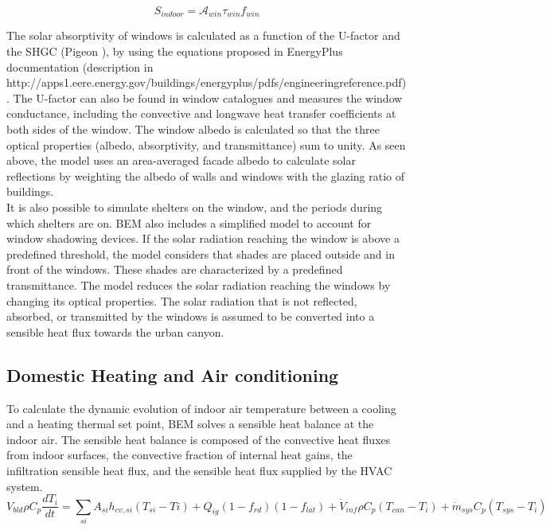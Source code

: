 \begin{equation}
S_{indoor} = \mathcal{A}_{win} \tau_{win} f_{win}
\end{equation}

The solar absorptivity of windows is calculated as a function of the U-factor and the SHGC (Pigeon )\nocite{Pigeon2014}, by using the equations proposed in EnergyPlus documentation (description in http://apps1.eere.energy.gov/buildings/energyplus/pdfs/engineeringreference.pdf). The U-factor can also be found in window catalogues and measures the window conductance, including the convective and longwave heat transfer coefficients at both sides of the window.
The window albedo is calculated so that the three optical properties  (albedo,  absorptivity,  and  transmittance)  sum  to unity. As seen above, the model uses an area-averaged facade albedo to calculate solar reflections by weighting the albedo of walls and windows with the glazing ratio of buildings. \\

It is also possible to simulate shelters on the window, and the periods during which shelters are on. BEM also includes a simplified model to account for window shadowing devices.  If the solar radiation reaching the window is above a predefined threshold, the model considers that shades are placed outside and in front of the windows. These shades are characterized by a predefined transmittance.  The model reduces the solar radiation reaching the windows by changing  its  optical  properties.   The  solar  radiation  that  is not reflected, absorbed, or transmitted by the windows is assumed to be converted into a sensible heat flux towards the urban canyon. \\


\subsection{Domestic Heating and Air conditioning}

To calculate the dynamic evolution of indoor air temperature between a cooling and a heating thermal set point, BEM solves a sensible heat balance at the indoor air.  The sensible heat balance is composed of the convective heat fluxes from indoor surfaces, the convective fraction of internal heat gains, the infiltration sensible heat flux, and the sensible heat
flux supplied by the HVAC system. \\

\begin{equation}
	V_{bld}\rho C_p \frac{dT_i}{dt} 
	= \sum_{si} A_{si}h_{cv,si}(T_{si}-T{i}) +Q_{ig}(1-f_{rd})(1-f_{lat}) + \dot{V}_{inf}\rho C_p (T_{can}-T_{i}) + \dot{m}_{sys}C_p (T_{sys}-T_{i}) \label{Ti}
\end{equation}

